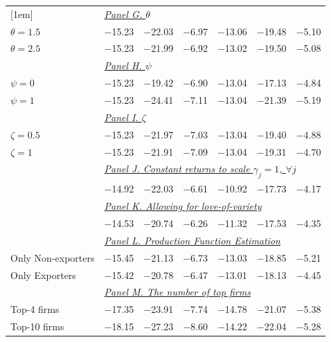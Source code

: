 \begin{tabular}{l ccc ccc }
[1em]
& \multicolumn{6}{l}{\underline{\textit{Panel G. $\theta$}}} \\
$\theta = 1.5$ & $-$15.23 & $-$22.03 & $-$6.97 & $-$13.06 & $-$19.48 & $-$5.10 \\
$\theta = 2.5$ & $-$15.23 & $-$21.99 & $-$6.92 & $-$13.02 & $-$19.50 & $-$5.08 \\
[1em]
& \multicolumn{6}{l}{\underline{\textit{Panel H. $\psi$}}} \\
$\psi = 0$ & $-$15.23 & $-$19.42 & $-$6.90 & $-$13.04 & $-$17.13 & $-$4.84 \\
$\psi = 1$ & $-$15.23 & $-$24.41 & $-$7.11 & $-$13.04 & $-$21.39 & $-$5.19 \\
[1em]
& \multicolumn{6}{l}{\underline{\textit{Panel I. $\zeta$}}} \\
$\zeta = 0.5$ & $-$15.23 & $-$21.97 & $-$7.03 & $-$13.04 & $-$19.40 & $-$4.88 \\
$\zeta = 1$ & $-$15.23 & $-$21.91 & $-$7.09 & $-$13.04 & $-$19.31 & $-$4.70 \\
[1em]
& \multicolumn{6}{l}{\underline{\textit{Panel J. Constant returns to scale $\gamma_j = 1$, $\forall j$}}} \\
 & $-$14.92 & $-$22.03 & $-$6.61 & $-$10.92 & $-$17.73 & $-$4.17 \\
[1em]
& \multicolumn{6}{l}{\underline{\textit{Panel K. Allowing for love-of-variety}}} \\
 & $-$14.53 & $-$20.74 & $-$6.26 & $-$11.32 & $-$17.53 & $-$4.35 \\
[1em]
& \multicolumn{6}{l}{\underline{\textit{Panel L. Production Function Estimation}}} \\
Only Non-exporters & $-$15.45 & $-$21.13 & $-$6.73 & $-$13.03 & $-$18.85 & $-$5.21 \\
Only Exporters & $-$15.42 & $-$20.78 & $-$6.47 & $-$13.01 & $-$18.13 & $-$4.45 \\
[1em]
& \multicolumn{6}{l}{\underline{\textit{Panel M. The number of top firms}}} \\
Top-4 firms & $-$17.35 & $-$23.91 & $-$7.74 & $-$14.78 & $-$21.07 & $-$5.38 \\
Top-10 firms & $-$18.15 & $-$27.23 & $-$8.60 & $-$14.22 & $-$22.04 & $-$5.28 \\
\bottomrule
\end{tabular}
